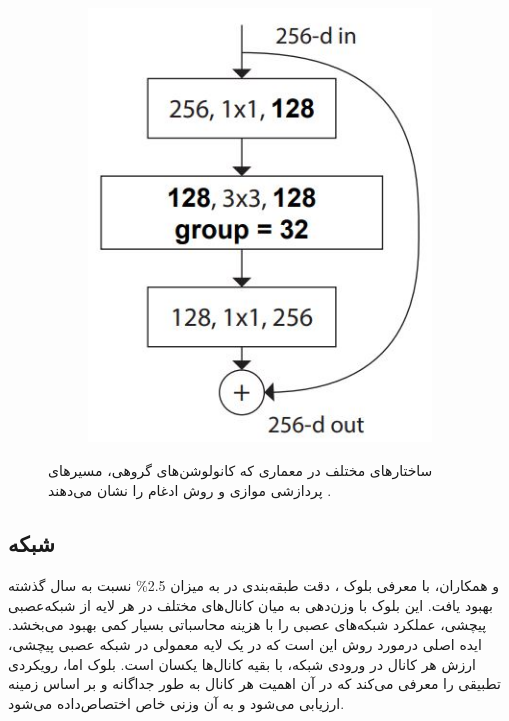 \begin{figure}[h!]
\begin{subfigure}{0.33\textwidth}
        \includegraphics[width=\linewidth]{Images/Chapter2/resnext3.JPG}
        \caption{}
        \label{fig:ch2-resnext3}
    \end{subfigure}
    \caption{ساختارهای مختلف در معماری 
     که کانولوشن‌های گروهی، مسیرهای پردازشی موازی و روش ادغام را نشان می‌دهند
     \cite{xie2017aggregated}.}
    \label{fig:fig:ch2-resnext}
\end{figure}







\subsection{شبکه
}

\cite{hu2018squeeze}
و همکاران،‌ با معرفی بلوک
 ، دقت طبقه‌بندی در  به میزان 2.5\% نسبت به سال گذشته بهبود یافت. این بلوک با وزن‌دهی به میان کانال‌های مختلف در هر لایه از شبکه‌عصبی پیچشی، عملکرد شبکه‌های عصبی را با هزینه محاسباتی بسیار کمی بهبود می‌بخشد.
ایده اصلی درمورد روش 
  این است که در یک لایه معمولی در شبکه عصبی پیچشی، ارزش هر کانال در ورودی شبکه، با بقیه کانال‌ها یکسان است. بلوک  اما، رویکردی تطبیقی را معرفی می‌کند که در آن اهمیت هر کانال به طور جداگانه و بر اساس زمینه ارزیابی می‌شود و به آن وزنی خاص اختصاص‌داده می‌شود.

